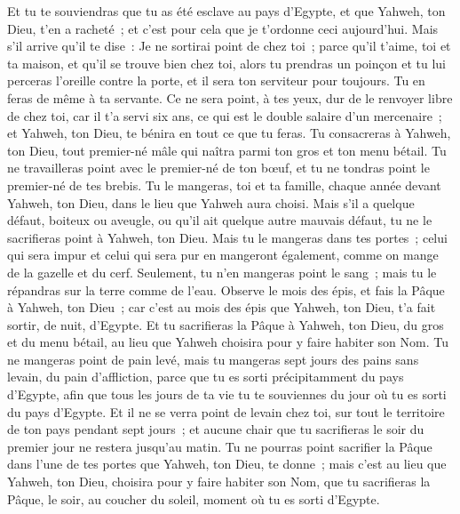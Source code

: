 \begin{multicols}{2}
Et tu te souviendras que tu as été esclave au pays d'Egypte, et que Yahweh, ton Dieu, t'en a racheté~; et c'est pour cela que je t'ordonne ceci aujourd'hui.
Mais s'il arrive qu'il te dise~: Je ne sortirai point de chez toi~; parce qu'il t'aime, toi et ta maison, et qu'il se trouve bien chez toi,
alors tu prendras un poinçon et tu lui perceras l'oreille contre la porte, et il sera ton serviteur pour toujours. Tu en feras de même à ta servante.
Ce ne sera point, à tes yeux, dur de le renvoyer libre de chez toi, car il t'a servi six ans, ce qui est le double salaire d'un mercenaire~; et Yahweh, ton Dieu, te bénira en tout ce que tu feras.
Tu consacreras à Yahweh, ton Dieu, tout premier-né mâle qui naîtra parmi ton gros et ton menu bétail. Tu ne travailleras point avec le premier-né de ton bœuf, et tu ne tondras point le premier-né de tes brebis.
Tu le mangeras, toi et ta famille, chaque année devant Yahweh, ton Dieu, dans le lieu que Yahweh aura choisi.
Mais s'il a quelque défaut, boiteux ou aveugle, ou qu'il ait quelque autre mauvais défaut, tu ne le sacrifieras point à Yahweh, ton Dieu.
Mais tu le mangeras dans tes portes~; celui qui sera impur et celui qui sera pur en mangeront également, comme on mange de la gazelle et du cerf.
Seulement, tu n'en mangeras point le sang~; mais tu le répandras sur la terre comme de l'eau.
\VerseOne{}Observe le mois des épis, et fais la Pâque à Yahweh, ton Dieu~; car c'est au mois des épis que Yahweh, ton Dieu, t'a fait sortir, de nuit, d'Egypte.
Et tu sacrifieras la Pâque à Yahweh, ton Dieu, du gros et du menu bétail, au lieu que Yahweh choisira pour y faire habiter son Nom.
Tu ne mangeras point de pain levé, mais tu mangeras sept jours des pains sans levain, du pain d'affliction, parce que tu es sorti précipitamment du pays d'Egypte, afin que tous les jours de ta vie tu te souviennes du jour où tu es sorti du pays d'Egypte.
Et il ne se verra point de levain chez toi, sur tout le territoire de ton pays pendant sept jours~; et aucune chair que tu sacrifieras le soir du premier jour ne restera jusqu'au matin.
Tu ne pourras point sacrifier la Pâque dans l'une de tes portes que Yahweh, ton Dieu, te donne~;
mais c'est au lieu que Yahweh, ton Dieu, choisira pour y faire habiter son Nom, que tu sacrifieras la Pâque, le soir, au coucher du soleil, moment où tu es sorti d'Egypte.

\end{multicols}
